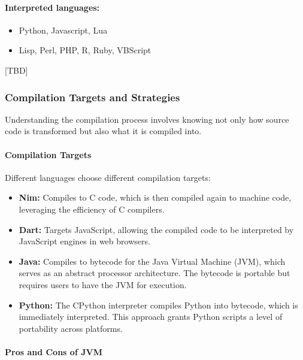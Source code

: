\documentclass[12pt]{article}
\begin{document}
\paragraph{Interpreted languages:}
\begin{itemize}
  \item Python, Javascript, Lua
  \item Lisp, Perl, PHP, R, Ruby, VBScript
\end{itemize}

[TBD]






\subsubsection{Compilation Targets and Strategies}

Understanding the compilation process involves knowing not only how source code is transformed but also what it is compiled into.

\paragraph{Compilation Targets}

Different languages choose different compilation targets:

\begin{itemize}
  \item \textbf{Nim:} Compiles to C code, which is then compiled again to machine code, leveraging the efficiency of C compilers.
  \item \textbf{Dart:} Targets JavaScript, allowing the compiled code to be interpreted by JavaScript engines in web browsers.
  \item \textbf{Java:} Compiles to bytecode for the Java Virtual Machine (JVM), which serves as an abstract processor architecture. The bytecode is portable but requires users to have the JVM for execution.
  \item \textbf{Python:} The CPython interpreter compiles Python into bytecode, which is immediately interpreted. This approach grants Python scripts a level of portability across platforms.
\end{itemize}

\paragraph{Pros and Cons of JVM}
\end{document}
